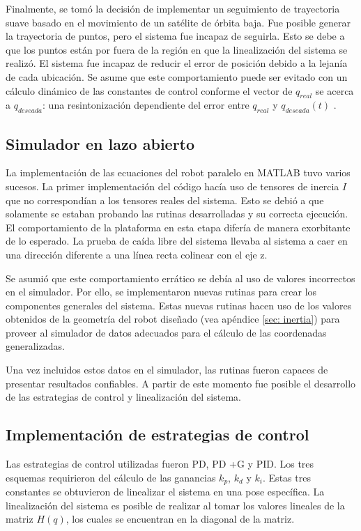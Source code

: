Finalmente, se tomó la decisión de implementar un seguimiento de trayectoria suave basado en el movimiento de un satélite de órbita baja.
Fue posible generar la trayectoria de puntos, pero el sistema fue incapaz de seguirla.
Esto se debe a que los puntos están por fuera de la región en que la linealización del sistema se realizó. 
El sistema fue incapaz de reducir el error de posición debido a la lejanía de cada ubicación.
Se asume que este comportamiento puede ser evitado con un cálculo dinámico de las constantes de control conforme el vector de $q_{real}$ se acerca a $q_{deseada}$: una resintonización dependiente del error entre $q_{real}$ y $q_{deseada}(t)$     .





\subsection{Simulador en lazo abierto}
La implementación de las ecuaciones del robot paralelo en 
MATLAB tuvo varios sucesos.
La primer implementación del código hacía uso de tensores de 
inercia $I$ que no correspondían a los tensores reales del sistema.
Esto se debió a que solamente se estaban probando las
rutinas desarrolladas y su correcta ejecución.
El comportamiento de la plataforma en esta etapa difería 
de manera exorbitante de lo esperado.
La prueba de caída libre del sistema llevaba al sistema a caer en 
una dirección diferente a una línea recta colinear con el eje z.

Se asumió que este comportamiento errático se debía al uso de 
valores incorrectos en el simulador.
Por ello, se implementaron nuevas rutinas para 
crear los componentes generales del sistema.
Estas nuevas rutinas hacen uso de los valores obtenidos de la
geometría del robot diseñado (vea apéndice \ref{sec: inertia})
para proveer al simulador de datos adecuados para
el cálculo de las coordenadas generalizadas.

Una vez incluidos estos datos en el simulador, 
las rutinas fueron capaces de 
presentar resultados confiables.
A partir de este momento fue posible el desarrollo
de las estrategias de control y 
linealización del sistema.

\subsection{Implementación de estrategias de control}
Las estrategias de control utilizadas fueron PD, PD +G y PID. 
Los tres esquemas requirieron del cálculo de las ganancias $k_p$, $k_d$ y $k_i$. 
Estas tres constantes se obtuvieron de linealizar el sistema en una pose específica. 
La linealización del sistema es posible de realizar al tomar los valores lineales de la matriz $H(q)$, los cuales se encuentran en la diagonal de la matriz.

